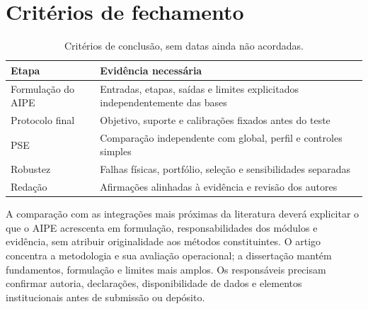 \section{Critérios de fechamento}
\begin{table}[htbp]\centering\small
\caption{Critérios de conclusão, sem datas ainda não acordadas.}\label{tab:cronograma}
\begin{tabular}{@{}p{4cm}p{8.8cm}@{}}\toprule
Etapa & Evidência necessária\\\midrule
Formulação do AIPE & Entradas, etapas, saídas e limites explicitados independentemente das bases\\
Protocolo final & Objetivo, suporte e calibrações fixados antes do teste\\
PSE & Comparação independente com global, perfil e controles simples\\
Robustez & Falhas físicas, portfólio, seleção e sensibilidades separadas\\
Redação & Afirmações alinhadas à evidência e revisão dos autores\\\bottomrule
\end{tabular}\end{table}

A comparação com as integrações mais próximas da literatura deverá explicitar o que o AIPE acrescenta em formulação, responsabilidades dos módulos e evidência, sem atribuir originalidade aos métodos constituintes. O artigo concentra a metodologia e sua avaliação operacional; a dissertação mantém fundamentos, formulação e limites mais amplos. Os responsáveis precisam confirmar autoria, declarações, disponibilidade de dados e elementos institucionais antes de submissão ou depósito.
